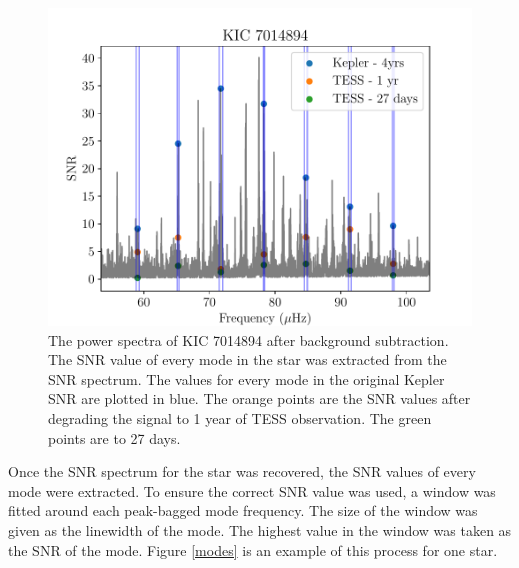 \documentclass[a4paper,fleqn,usenatbib,useAMS]{mnras}
\begin{document}
\begin{figure}
	\centering
	\includegraphics[scale=0.6]{plot4_SNR7014894.pdf}
	\caption{The power spectra of KIC 7014894 after background subtraction. The SNR value of every mode in the star was extracted from the SNR spectrum. The values for every mode in the original Kepler SNR are plotted in blue. The orange points are the SNR values after degrading the signal to 1 year of TESS observation. The green points are to 27 days.}	
	\label{snr}
\end{figure}

Once the SNR spectrum for the star was recovered, the SNR values of every mode were extracted. To ensure the correct SNR value was used, a window was fitted around each peak-bagged mode frequency. The size of the window was given as the linewidth of the mode. The highest value in the window was taken as the SNR of the mode. Figure \ref{modes} is an example of this process for one star. 
\end{document}
